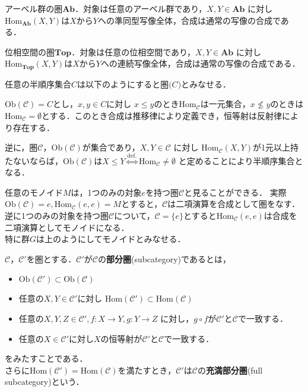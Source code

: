 \begin{ex}
アーベル群の圏$\mathbf{Ab}$．対象は任意のアーベル群であり，$X,Y \in \mathbf{Ab}$ に対し$\mathrm{Hom}_\mathbf{Ab}(X,Y)$は$X$から$Y$への準同型写像全体，合成は通常の写像の合成である．
\end{ex} \proofend

\begin{ex}
位相空間の圏$\mathbf{Top}$．対象は任意の位相空間であり，$X,Y \in \mathbf{Ab}$ に対し$\mathrm{Hom}_\mathbf{Top}(X,Y)$は$X$から$Y$への連続写像全体，合成は通常の写像の合成である．
\end{ex} \proofend

\begin{ex}
任意の半順序集合$C$は以下のようにすると圏$\mathcal(C)$とみなせる．

$\mathrm{Ob}(\mathcal{C}) = C$とし，$x, y \in C$に対し $x \leq y$のとき$\mathrm{Hom}_\mathcal{C}$は一元集合，$x \nleq y$のときは
$\mathrm{Hom}_\mathcal{C} = \emptyset$とする．このとき合成は推移律により定義でき，恒等射は反射律により存在する．

逆に，圏$\mathcal{C}$，$\mathrm{Ob}(\mathcal{C})$が集合であり，$X,Y \in \mathcal{C}$ に対し $\mathrm{Hom}_\mathcal{C}(X,Y)$が1元以上持たないならば，$\mathrm{Ob}(\mathcal{C})$は$X \leq Y \stackrel{\mathrm{def.}}{\Leftrightarrow} \mathrm{Hom}_\mathcal{C} \neq\emptyset$ と定めることにより半順序集合となる．
\end{ex} \proofend

\begin{ex}
任意のモノイド$M$は，1つのみの対象$e$を持つ圏$\mathcal{C}$と見ることができる．
実際$\mathrm{Ob}(\mathcal{C}) = {e},\mathrm{Hom}_{\mathcal{C}}(e,e) = M$とすると，$\mathcal{C}$は二項演算を合成として圏をなす．逆に1つのみの対象を持つ圏$\mathcal{C}$について，$\mathcal{C} = \{e\}$とすると$\mathrm{Hom}_{\mathcal{C}}(e,e)$は合成を二項演算としてモノイドになる．\\
特に群$G$は上のようにしてモノイドとみなせる．
\end{ex} \proofend

\begin{defi}
$\mathcal{C}，\mathcal{C'}$を圏とする．$\mathcal{C'}が\mathcal{C}$の{\bf 部分圏}(subcategory)であるとは，
\begin{itemize}
\item $\mathrm{Ob}(\mathcal{C'}) \subset \mathrm{Ob}(\mathcal{C})$
\item 任意の$X,Y \in \mathcal{C'}$に対し $ \mathrm{Hom}(\mathcal{C'}) \subset \mathrm{Hom}(\mathcal{C})$
\item 任意の$X,Y, Z \in \mathcal{C'}, f:X \to Y , g:Y \to Z$ に対し，$g \circ f$が$\mathcal{C'}$と$\mathcal{C}$で一致する．
\item 任意の$X \in \mathcal{C'}$に対し$X$の恒等射が$\mathcal{C'}$と$\mathcal{C}$で一致する．
\end{itemize}
をみたすことである．\\
さらに$ \mathrm{Hom}(\mathcal{C'}) = \mathrm{Hom}(\mathcal{C})$を満たすとき，$\mathcal{C'}$は$\mathcal{C}$の{\bf 充満部分圏}(full subcategory)という．
\end{defi} \proofend

